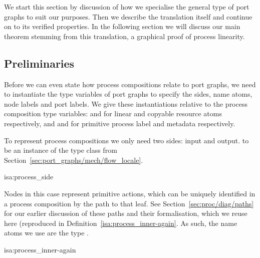 \documentclass[class=smolathesis,crop=false]{standalone}
\begin{document}
We start this section by discussion of how we specialise the general type of port graphs to suit our purposes.
Then we describe the translation itself and continue on to its verified properties.
In the following section we will discuss our main theorem stemming from this translation, a graphical proof of process linearity.

\subsection{Preliminaries}
\label{sec:port_graphs/process/prelim}

Before we can even state how process compositions relate to port graphs, we need to instantiate the type variables of port graphs to specify the sides, name atoms, node labels and port labels.
We give these instantiations relative to the process composition type variables:  and  for linear and copyable resource atoms respectively, and  and  for primitive process label and metadata respectively.

To represent process compositions we only need two sides: input and output.
 to be an instance of the  type class from Section~\ref{sec:port_graphs/mech/flow_locale}.
\begin{isadef}{isa:process_side}
  
\item
  
\end{isadef}

Nodes in this case represent primitive actions, which can be uniquely identified in a process composition by the path to that leaf.
See Section~\ref{sec:proc/diag/paths} for our earlier discussion of these paths and their formalisation, which we reuse here (reproduced in Definition~\ref{isa:process_inner-again}.
As such, the name atoms we use are the type .
\begin{isadef}{isa:process_inner-again}
  
\end{isadef}
\end{document}
